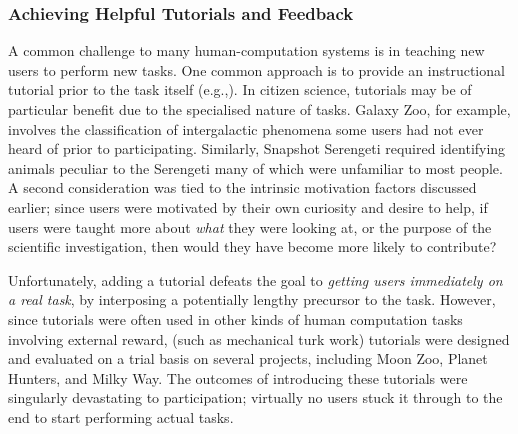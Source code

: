 \documentclass{sigchi}
\begin{document}

\subsubsection{Achieving Helpful Tutorials and Feedback}
A common challenge to many human-computation systems is in teaching new users to perform new tasks. One common approach is to provide an instructional tutorial prior to the task itself (e.g.,\cite{gutheim2012fantasktic}).  In citizen science, tutorials may be of particular benefit due to the specialised nature of tasks. Galaxy Zoo, for example, involves the classification of intergalactic phenomena some users had not ever heard of prior to participating.  Similarly, Snapshot Serengeti required identifying animals peculiar to the Serengeti many of which were unfamiliar to most people.  A second consideration was tied to the intrinsic motivation factors discussed earlier; since users were motivated by their own curiosity and desire to help, if users were taught more about \emph{what} they were looking at, or the purpose of the scientific investigation, then would they have become more likely to contribute?

Unfortunately, adding a tutorial defeats the goal to \emph{getting users immediately on a real task}, by interposing a potentially lengthy precursor to the task.  However, since tutorials were often used in other kinds of human computation tasks involving external reward, (such as mechanical turk work) tutorials were designed and evaluated on a trial basis on several projects, including Moon Zoo, Planet Hunters, and Milky Way. The outcomes of introducing these tutorials were singularly devastating to participation; virtually no users stuck it through to the end to start performing actual tasks. 

\end{document}

